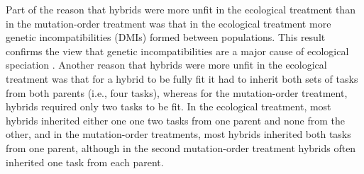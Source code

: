 \begin{doublespace}




Part of the reason that hybrids were more unfit in the ecological treatment
than in the mutation-order treatment was that in the ecological treatment
more genetic incompatibilities (DMIs) formed between populations.
%
This result confirms the view that genetic incompatibilities
are a major cause of ecological speciation \citep{run05}.
%
Another reason that hybrids were more unfit in the ecological treatment was
that for a hybrid to be fully fit it had to inherit both sets of tasks from
both parents (i.e., four tasks), whereas for the mutation-order treatment,
hybrids required only two tasks to be fit.
%
In the ecological treatment, most hybrids inherited either one one two tasks
from one parent and none from the other, and in the mutation-order treatments,
most hybrids inherited both tasks from one parent, although in the second
mutation-order treatment hybrids often inherited one task from each parent.




\end{doublespace}
